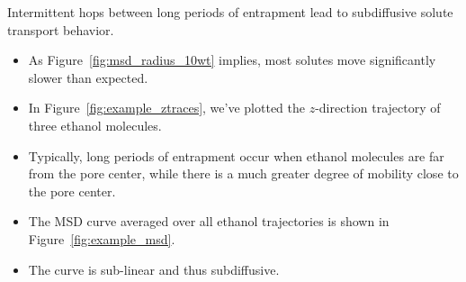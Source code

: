 \documentclass{article}
\begin{document}
  
  \noindent Intermittent hops between long periods of entrapment lead
  to subdiffusive solute transport behavior. 
  \begin{itemize}
    \item As Figure~\ref{fig:msd_radius_10wt} implies, most solutes
    move significantly slower than expected.
    \item In Figure~\ref{fig:example_ztraces}, we've plotted the $z$-direction
    trajectory of three ethanol molecules.
    \item Typically, long periods of entrapment occur when ethanol 
    molecules are far from the pore center, while there is a much 
    greater degree of mobility close to the pore center.
    \item The MSD curve averaged over all ethanol trajectories is shown
    in Figure~\ref{fig:example_msd}.
    \item The curve is sub-linear and thus subdiffusive.
  \end{itemize}
  
\end{document}
